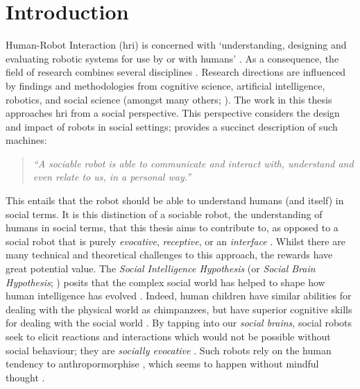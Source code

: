 \chapter{Introduction} \label{chap:intro}
Human-Robot Interaction (\acrshort{hri}) is concerned with `understanding, designing and evaluating robotic systems for use by or with humans' \citep{goodrich2007human}. As a consequence, the field of research combines several disciplines \citep{fong2003survey}. Research directions are influenced by findings and methodologies from cognitive science, artificial intelligence, robotics, and social science (amongst many others; \citealp{baxter2016althri}). The work in this thesis approaches \acrshort{hri} from a social perspective. This perspective considers the design and impact of robots in social settings; \cite{breazeal2002designing} provides a succinct description of such machines:
\begin{quote}
\textit{``A sociable robot is able to communicate and interact with, understand and even relate to us, in a personal way.''}
\end{quote}

This entails that the robot should be able to understand humans (and itself) in social terms. It is this distinction of a sociable robot, the understanding of humans in social terms, that this thesis aims to contribute to, as opposed to a social robot that is purely \textit{evocative}, \textit{receptive}, or an \textit{interface} \citep{breazeal2003toward}.
Whilst there are many technical and theoretical challenges to this approach, the rewards have great potential value. The \textit{Social Intelligence Hypothesis} (or \textit{Social Brain Hypothesis}; \citealp{dunbar2002social}) posits that the complex social world has helped to shape how human intelligence has evolved \citep{holekamp2007questioning}. Indeed, human children have similar abilities for dealing with the physical world as chimpanzees, but have superior cognitive skills for dealing with the social world \citep{herrmann2007humans}. By tapping into our \textit{social brains}, social robots seek to elicit reactions and interactions which would not be possible without social behaviour; they are \textit{socially evocative} \citep{fong2003survey}. Such robots rely on the human tendency to anthropormorphise \citep{reeves1996people}, which seems to happen without mindful thought \citep{kim2012anthropomorphism}.

